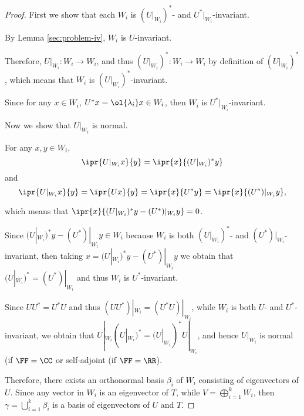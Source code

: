 \documentclass[11pt]{scrartcl}
\begin{document}
\begin{proof}
  \hfill

  First we show that each $W_i$ is $(U|_{W_i})^{*}$- and $U^{*}|_{W_i}$-invariant.

  By Lemma \ref{sec:problem-iv}, $W_i$ is $U$-invariant.

  Therefore, $U|_{W_i}:W_i\to W_i$, and thus
  $(U|_{W_i})^{*}: W_i\to W_i$ by definition of $(U|_{W_i})^{*}$,
  which means that $W_i$ is $(U|_{W_i})^{*}$-invariant.
  
  Since for any $x \in W_i$, $U^{*}x = \ol{\lambda_i}x \in W_i$, then
  $W_i$ is $U^{*}|_{W_i}$-invariant.

  Now we show that $U|_{W_i}$ is normal.

  For any $x, y\in W_i$,
  \[\ipr{U|_{W_i}x}{y} = \ipr{x}{(U|_{W_i})^{*}y}\]
  and
  \[\ipr{U|_{W_{i}}x}{y}  = \ipr{Ux}{y} = \ipr{x}{U^{*}y} = \ipr{x}{(U^{*})|_{W_i} y},\]

  which means that $\ipr{x}{(U|_{W_i})^{*}y - (U^{*})|_{W_i} y} = 0$.


  Since $(U|_{W_i})^{*}y - (U^{*})|_{W_i} y \in W_i$ because $W_i$ is
  both $(U|_{W_i})^{*}$- and $(U^{*})|_{W_i}$-invariant, then taking
  $x = (U|_{W_i})^{*}y - (U^{*})|_{W_i} y$ we obtain that
  $(U|_{W_i})^{*} = (U^{*})|_{W_i} $ and thus $W_i$ is $U^{*}$-invariant. 

  Since $UU^{*}=U^{*}U$ and thus $(UU^{*})|_{W_i} = (U^{*}U)|_{W_i}$,
  while $W_i$ is both $U$- and $U^{*}$-invariant, we obtain that
  $U|_{W_i}(U|_{W_i})^{*} = (U|_{W_i})^{*}U|_{W_i}$, and hence
  $U|_{W_i}$ is normal (if $\FF = \CC$ or self-adjoint (if $\FF = \RR$). 


  Therefore, there exists an orthonormal basis $\beta_i$ of $W_i$
  consisting of eigenvectors of $U$. Since any vector in $W_i$ is an
  eigenvector of $T$, while $V = \bigoplus_{i=1}^kW_i$, then
  $\gamma = \bigcup_{i=1}^k\beta_i$ is a basis of eigenvectors of $U$ and $T$.

  
  
\end{proof}
\end{document}
